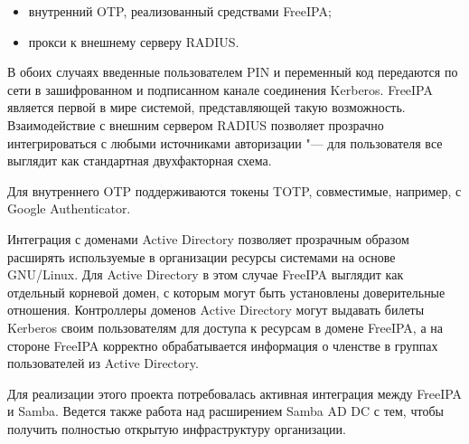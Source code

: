 \documentclass[10pt, a5paper]{article}
\begin{document}
\begin{itemize}
  \item внутренний OTP, реализованный средствами FreeIPA;
  \item прокси к внешнему серверу RADIUS.
\end{itemize}

В обоих случаях введенные пользователем PIN и переменный код передаются по сети в зашифрованном и подписанном канале соединения Kerberos. FreeIPA является первой в мире системой, представляющей такую возможность. Взаимодействие с внешним сервером RADIUS позволяет прозрачно интегрироваться с любыми источниками авторизации "--- для пользователя все выглядит как стандартная двухфакторная схема.

Для внутреннего OTP поддерживаются токены TOTP, совместимые, например, с Google Authenticator.

Интеграция с доменами Active Directory позволяет прозрачным образом расширять используемые в организации ресурсы системами на основе
GNU/Linux. Для Active Directory в этом случае FreeIPA выглядит как отдельный корневой домен, с которым могут быть установлены доверительные отношения. Контроллеры доменов Active Directory могут выдавать билеты Kerberos своим пользователям для доступа к ресурсам в домене FreeIPA, а на стороне FreeIPA корректно обрабатывается информация о членстве в группах пользователей из Active Directory.

Для реализации этого проекта потребовалась активная интеграция между
FreeIPA и Samba. Ведется также работа над расширением Samba AD DC с тем, чтобы получить полностью открытую инфраструктуру организации.
\end{document}
